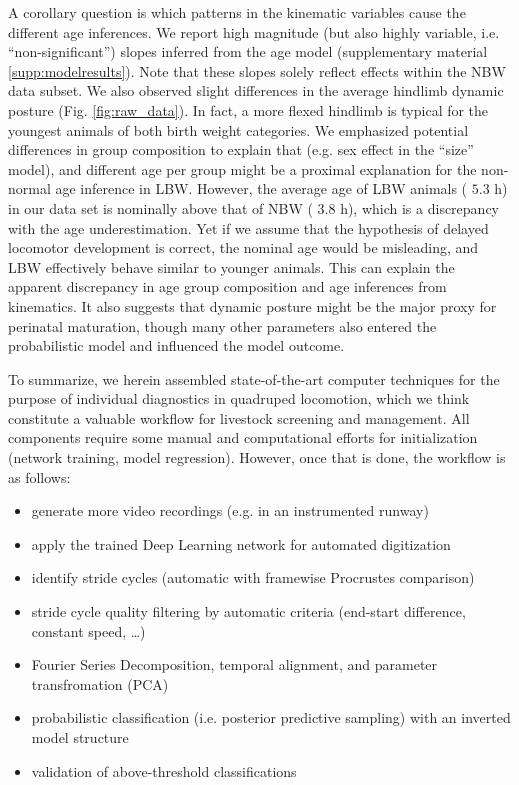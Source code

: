 \bigskip
\pagebreak
A corollary question is which patterns in the kinematic variables cause the different age inferences.
We report high magnitude (but also highly variable, i.e. ``non-significant'') slopes inferred from the age model (supplementary material \ref{supp:modelresults}).
Note that these slopes solely reflect effects within the NBW data subset.
We also observed slight differences in the average hindlimb dynamic posture (Fig. \ref{fig:raw_data}).
In fact, a more flexed hindlimb is typical for the youngest animals of both birth weight categories.
We emphasized potential differences in group composition to explain that (e.g. sex effect in the ``size'' model), and different age per group might be a proximal explanation for the non-normal age inference in LBW.
However, the average age of LBW animals (
\(5.3\) h) in our data set is nominally above that of NBW (
\(3.8\)
h), which is a discrepancy with the age underestimation.
Yet if we assume that the hypothesis of delayed locomotor development is correct, the nominal age would be misleading, and LBW effectively behave similar to younger animals.
This can explain the apparent discrepancy in age group composition and age inferences from kinematics.
It also suggests that dynamic posture might be the major proxy for perinatal maturation, though many other parameters also entered the probabilistic model and influenced the model outcome.


\bigskip
To summarize, we herein assembled state-of-the-art computer techniques for the purpose of individual diagnostics in quadruped locomotion, which we think constitute a valuable workflow for livestock screening and management.
All components require some manual and computational efforts for initialization (network training, model regression).
However, once that is done, the workflow is as follows:
\begin{itemize}
\item generate more video recordings (e.g. in an instrumented runway)
\item apply the trained Deep Learning network for automated digitization
\item identify stride cycles (automatic with framewise Procrustes comparison)
\item stride cycle quality filtering by automatic criteria (end-start difference, constant speed, \ldots{})
\item Fourier Series Decomposition, temporal alignment, and parameter transfromation (PCA)
\item probabilistic classification (i.e. posterior predictive sampling) with an inverted model structure
\item validation of above-threshold classifications
\end{itemize}

